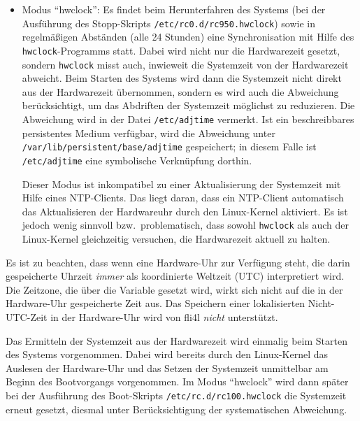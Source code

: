 \begin{description}
{\begin{itemize}
  Dieser Modus muss auch verwendet werden, wenn gar keine Hardware-Uhr
  existiert. Der Linux-Kernel wird in diesem Falle natürlich keine Hardwarezeit
  aktuell halten, weil es keine gibt. Es sollte dann allerdings unbedingt ein
  NTP-Client verwendet werden, damit der fli4l-Router überhaupt eine sinnvolle
  Systemzeit erhält.

  \item Modus ``hwclock'': Es findet beim Herunterfahren des Systems
  (bei der Ausführung des Stopp-Skripts \texttt{/etc/rc0.d/rc950.hwclock})
  sowie in regelmäßigen Abständen (alle 24 Stunden) eine Synchronisation mit
  Hilfe des \texttt{hwclock}-Programms statt. Dabei wird nicht nur die
  Hardwarezeit gesetzt, sondern \texttt{hwclock} misst auch, inwieweit die
  Systemzeit von der Hardwarezeit abweicht. Beim Starten des Systems wird dann
  die Systemzeit nicht direkt aus der Hardwarezeit übernommen, sondern es wird
  auch die Abweichung berücksichtigt, um das Abdriften der Systemzeit möglichst
  zu reduzieren. Die Abweichung wird in der Datei \texttt{/etc/adjtime}
  vermerkt. Ist ein beschreibbares persistentes Medium verfügbar, wird die
  Abweichung unter \texttt{/var/lib/persistent/base/adjtime} gespeichert; in
  diesem Falle ist \texttt{/etc/adjtime} eine symbolische Verknüpfung dorthin.
  
  Dieser Modus ist inkompatibel zu einer Aktualisierung der Systemzeit mit
  Hilfe eines NTP-Clients. Das liegt daran, dass ein NTP-Client automatisch
  das Aktualisieren der Hardwareuhr durch den Linux-Kernel aktiviert. Es ist
  jedoch wenig sinnvoll bzw.\ problematisch, dass sowohl \texttt{hwclock} als
  auch der Linux-Kernel gleichzeitig versuchen, die Hardwarezeit aktuell zu
  halten.
  \end{itemize}
  
  Es ist zu beachten, dass wenn eine Hardware-Uhr zur Verfügung steht, die
  darin gespeicherte Uhrzeit \emph{immer} als koordinierte Weltzeit (UTC)
  interpretiert wird. Die Zeitzone, die über die Variable 
  gesetzt wird, wirkt sich nicht auf die in der Hardware-Uhr gespeicherte
  Zeit aus. Das Speichern einer lokalisierten Nicht-UTC-Zeit in der
  Hardware-Uhr wird von fli4l \emph{nicht} unterstützt.
  
  Das Ermitteln der Systemzeit aus der Hardwarezeit wird einmalig beim Starten
  des Systems vorgenommen. Dabei wird bereits durch den Linux-Kernel das
  Auslesen der Hardware-Uhr und das Setzen der Systemzeit unmittelbar am Beginn
  des Bootvorgangs vorgenommen. Im Modus ``hwclock'' wird dann später bei der
  Ausführung des Boot-Skripts \texttt{/etc/rc.d/rc100.hwclock} die Systemzeit
  erneut gesetzt, diesmal unter Berücksichtigung der systematischen Abweichung.
  }


\end{description}
